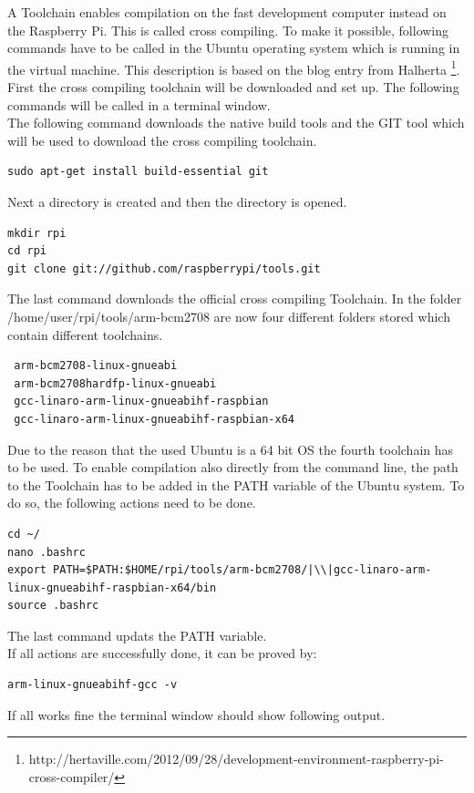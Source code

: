 A Toolchain enables compilation on the fast development computer instead on the Raspberry Pi. This is called cross compiling. To make it possible, following commands have to be called in the Ubuntu operating system which is running in the virtual machine. This description is based on the blog entry from Halherta \footnote{http://hertaville.com/2012/09/28/development-environment-raspberry-pi-cross-compiler/}.\\
First the cross compiling toolchain will be downloaded and set up. The following commands will be called in a terminal window.\\
The following command downloads the native build tools and the GIT tool which will be used to download the cross compiling toolchain.
\begin{lstlisting}
sudo apt-get install build-essential git
\end{lstlisting}
Next a directory is created and then the directory is opened.
\begin{lstlisting}
mkdir rpi
cd rpi
git clone git://github.com/raspberrypi/tools.git
\end{lstlisting}
The last command downloads the official cross compiling Toolchain. 
In the folder \newline/home/user/rpi/tools/arm-bcm2708 are now four different folders stored which contain different toolchains.
\begin{lstlisting}
 arm-bcm2708-linux-gnueabi
 arm-bcm2708hardfp-linux-gnueabi
 gcc-linaro-arm-linux-gnueabihf-raspbian
 gcc-linaro-arm-linux-gnueabihf-raspbian-x64
\end{lstlisting}
Due to the reason that the used Ubuntu is a 64 bit OS the fourth toolchain has to be used.
To enable compilation also directly from the command line, the path to the Toolchain has to be added in the PATH variable of the Ubuntu system. To do so, the following actions need to be done.

\begin{lstlisting}[escapechar=|]
cd ~/
nano .bashrc
export PATH=$PATH:$HOME/rpi/tools/arm-bcm2708/|\\|gcc-linaro-arm-linux-gnueabihf-raspbian-x64/bin
source .bashrc
\end{lstlisting}
The last command updats the PATH variable.\\
If all actions are successfully done, it can be proved by:
\begin{lstlisting}
arm-linux-gnueabihf-gcc -v
\end{lstlisting}
If all works fine the terminal window should show following output.

